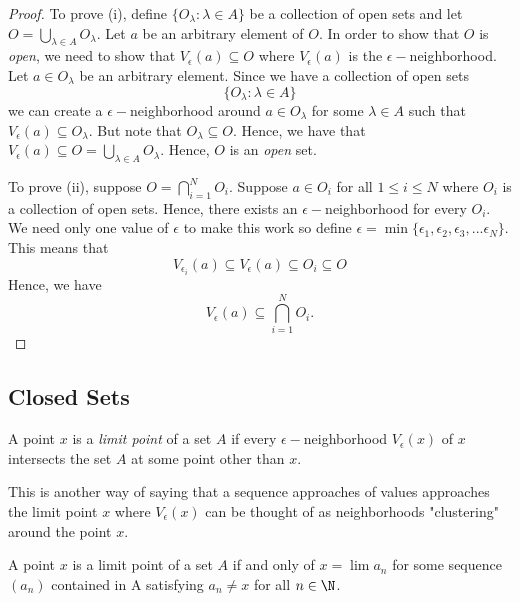 \begin{proof}
    To prove (i), define \( \{ O_{\lambda} : \lambda \in A \}  \) be a collection of open sets and let \( O = \bigcup_{ \lambda \in A  } O_{\lambda} \). Let \( a  \) be an arbitrary element of \( O \). In order to show that \( O \) is \textit{open}, we need to show that \( V_{\epsilon }(a) \subseteq O \) where \( V_{\epsilon }(a) \) is the \( \epsilon - \)neighborhood. Let \(  a \in O_{\lambda} \) be an arbitrary element. Since we have a collection of open sets 
    \[ \{ O_{\lambda}  : \lambda \in A \}  \]
    we can create a \( \epsilon - \)neighborhood around \( a \in O_{\lambda}  \) for some \( \lambda \in A  \) such that \( V_{\epsilon }(a) \subseteq O_{\lambda}\). But note that \( O_{\lambda} \subseteq O \). Hence, we have that \( V_{\epsilon } (a) \subseteq O = \bigcup_{ \lambda \in A  } O_{\lambda}\). Hence, \( O \) is an \textit{open} set.
    
    To prove (ii), suppose \( O = \bigcap_{ i =1  }^{ N } O_{i}  \). Suppose \( a \in O_{i} \) for all \( 1 \leq  i \leq N \) where \( O_{i} \) is a collection of open sets. Hence, there exists an \( \epsilon- \)neighborhood for every \( O_i  \). We need only one value of \( \epsilon  \) to make this work so define \( \epsilon = \min \{ \epsilon_1, \epsilon_2, \epsilon_3, ... \epsilon_N \}  \).  This means that \[ V_{\epsilon_i} (a) \subseteq V_{\epsilon}(a) \subseteq O_{i} \subseteq O  \] 
Hence, we have 
\[ V_{\epsilon}(a) \subseteq \bigcap_{ i=1 }^{ N } O_i. \] 
\end{proof}

\subsection{Closed Sets} 

\begin{tcolorbox}
\begin{defn}
    A point \( x \) is a \textit{limit point} of a set \( A  \) if every \( \epsilon- \)neighborhood \( V_{\epsilon }(x) \) of \( x \) intersects the set \( A  \) at some point other than \( x \). 
\end{defn}
\end{tcolorbox}

This is another way of saying that a sequence approaches of values approaches the limit point \( x \) where \( V_{\epsilon }(x) \) can be thought of as neighborhoods "clustering" around the point \( x \). 

\begin{tcolorbox}
\begin{thm}
A point \( x \) is a limit point of a set \( A \) if and only of \( x = \lim a_n \) for some sequence \( (a_n) \) contained in A satisfying \( a_n \neq x  \) for all \( n \in \N  \). 
\end{thm}
\end{tcolorbox}

